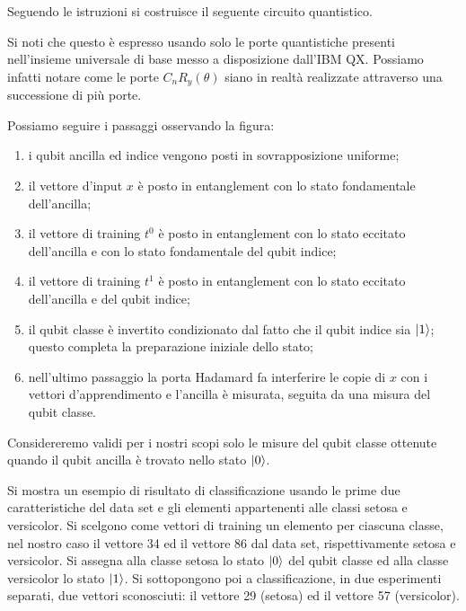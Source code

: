 Seguendo le istruzioni si costruisce il seguente circuito quantistico. 


Si noti che questo è espresso usando solo le porte quantistiche presenti 
nell'insieme universale di base messo a disposizione dall'IBM QX. Possiamo infatti notare 
come le porte $C_n R_y (\theta)$ siano in realtà realizzate attraverso una 
successione di più porte. 

Possiamo seguire i passaggi osservando la figura: 
\begin{enumerate}
    \item i qubit ancilla ed indice vengono posti in sovrapposizione uniforme; 
    \item il vettore d'input $x$ è posto in entanglement con lo stato fondamentale 
    dell'ancilla;
    \item il vettore di training $t^0$ è posto in entanglement con lo stato eccitato 
    dell'ancilla e con lo stato fondamentale del qubit indice;
    \item il vettore di training $t^1$ è posto in entanglement con lo stato eccitato 
    dell'ancilla e del qubit indice;
    \item il qubit classe è invertito condizionato dal fatto che il qubit indice sia $\ket{1}$; 
    questo completa la preparazione iniziale dello stato; 
    \item nell'ultimo passaggio la porta Hadamard fa interferire le copie di $x$ con i vettori 
    d'apprendimento e l'ancilla è misurata, seguita da una misura del qubit classe. 
\end{enumerate}
Considereremo validi per i nostri scopi solo le misure del qubit classe ottenute quando il 
qubit ancilla è trovato nello stato $\ket{0}$. 

Si mostra un esempio di risultato di classificazione usando le prime due caratteristiche 
del data set e gli elementi appartenenti alle classi setosa e versicolor. 
Si scelgono come vettori di training un elemento per ciascuna classe, nel nostro caso 
il vettore 34 ed il vettore 86 dal data set, rispettivamente setosa e versicolor. 
Si assegna alla classe setosa lo stato $\ket{0}$ del qubit classe ed alla classe 
versicolor lo stato $\ket{1}$. 
Si sottopongono poi a classificazione, in due esperimenti separati, due vettori sconosciuti: 
il vettore 29 (setosa) ed il vettore 57 (versicolor). 

